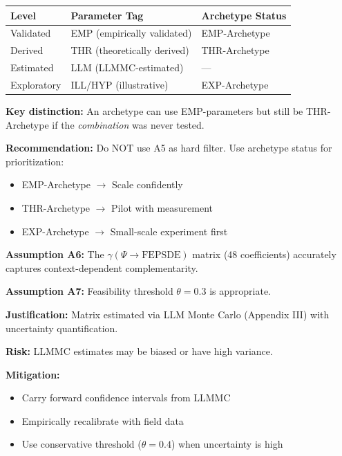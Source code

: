 \begin{tcolorbox}[colback=red!5!white, colframe=red!75!black,
    title=\textbf{Assumption A5: Empirical Evidence Requirement} $\triangleright$ \textit{Highest Risk}]
\begin{center}
\small
\renewcommand{\arraystretch}{1.2}
\begin{tabular}{@{}lll@{}}
\toprule
\textbf{Level} & \textbf{Parameter Tag} & \textbf{Archetype Status} \\
\midrule
Validated & EMP (empirically validated) & EMP-Archetype \\
Derived & THR (theoretically derived) & THR-Archetype \\
Estimated & LLM (LLMMC-estimated) & --- \\
Exploratory & ILL/HYP (illustrative) & EXP-Archetype \\
\bottomrule
\end{tabular}
\end{center}

\textbf{Key distinction:} An archetype can use EMP-parameters but still be THR-Archetype if the \textit{combination} was never tested.

\textbf{Recommendation:} Do NOT use A5 as hard filter. Use archetype status for prioritization:
\begin{itemize}[nosep]
\item EMP-Archetype $\rightarrow$ Scale confidently
\item THR-Archetype $\rightarrow$ Pilot with measurement
\item EXP-Archetype $\rightarrow$ Small-scale experiment first
\end{itemize}
\end{tcolorbox}

\begin{tcolorbox}[colback=yellow!5!white, colframe=yellow!75!black,
    title=\textbf{Assumptions A6--A7: $\gamma(\Psi)$ Context Filter}]
\textbf{Assumption A6:} The $\gamma(\Psi \rightarrow \text{FEPSDE})$ matrix (48 coefficients) accurately captures context-dependent complementarity.

\textbf{Assumption A7:} Feasibility threshold $\theta = 0.3$ is appropriate.

\textbf{Justification:} Matrix estimated via LLM Monte Carlo (Appendix III) with uncertainty quantification.

\textbf{Risk:} LLMMC estimates may be biased or have high variance.

\textbf{Mitigation:}
\begin{itemize}[nosep]
\item Carry forward confidence intervals from LLMMC
\item Empirically recalibrate with field data
\item Use conservative threshold ($\theta = 0.4$) when uncertainty is high
\end{itemize}
\end{tcolorbox}

